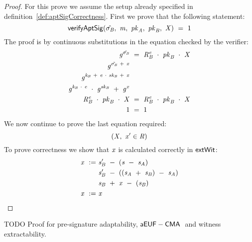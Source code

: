 \begin{proof}
    \label{prf:aptSchnorrPreSigCorr}
    For this prove we assume the setup already specified in definition~\ref{def:aptSigCorrectness}.
    First we prove that the following statement:
    \[
        \mathsf{verifyAptSig}(\hat{\sigma_{\mathit{B}}} ,~ \mathit{m} ,~ \mathit{pk}_{\mathit{A}} ,~ \mathit{pk}_{\mathit{B}} ,~ \mathit{X}) ~=~ 1
    \]
    The proof is by continuous substitutions in the equation checked by the verifier:
    \begin{align}
        \mathit{g}^{\hat{\sigma_{\mathit{B}}}} &~=~ \mathit{R}_{\mathit{B}}^{\mathit{e}} ~\cdot~ \mathit{pk}_{\mathit{B}} ~\cdot~ \mathit{X} \\
        \mathit{g}^{\tilde{\sigma_{\mathit{B}}} ~+~ \mathit{x}} & \\
        \mathit{g}^{\mathit{\mathit{k}_{\mathit{B}}} ~+~ \mathit{e} ~\cdot~ \mathit{sk}_{\mathit{B}} ~+~ \mathit{x}} & \\
        \mathit{g}^{\mathit{\mathit{k}_{\mathit{B}}} ~\cdot~ \mathit{e}} ~\cdot~ \mathit{g}^{\mathit{sk}_{\mathit{B}}} ~+~ \mathit{g}^{\mathit{x}} & \\
        \mathit{R}_{\mathit{B}}^{\mathit{e}} ~\cdot~ \mathit{pk}_{\mathit{B}} ~\cdot~ \mathit{X} &~=~ \mathit{R}_{\mathit{B}}^{\mathit{e}} ~\cdot~ \mathit{pk}_{\mathit{B}} ~\cdot~ \mathit{X} \\
        1 &~=~ 1
    \end{align}
    We now continue to prove the last equation required:
    \[
        (\mathit{X} ,~ \mathit{x}' \in \mathit{R})
    \]
    To prove correctness we show that $\mathit{x}$ is calculated correctly in $\mathsf{extWit}$:
    \begin{align}
        \mathit{x} ~:=~ & \mathit{s}_{\mathit{B}}' ~-~ (\mathit{s} ~-~ \mathit{s}_{\mathit{A}}) \\
        & \mathit{s}_{\mathit{B}}' ~-~ ((\mathit{s}_{\mathit{A}} ~+~ \mathit{s}_{\mathit{B}} ) ~-~ \mathit{s}_{\mathit{A}} ) \\
        & \mathit{s}_{\mathit{B}} ~+~ \mathit{x} ~-~ (\mathit{s}_{\mathit{B}}) \\
        \mathit{x} ~:=~ & \mathit{x} \\
    \end{align}

\end{proof}

TODO Proof for pre-signature adaptability, $\mathsf{aEUF-CMA\;}$ and witness extractability.